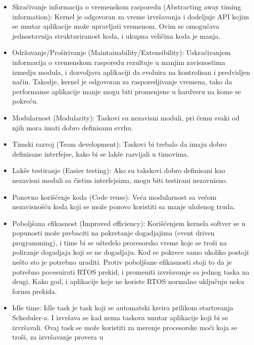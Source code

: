 \documentclass[a4paper,12pt, master]{etf}
\begin{document}
	\begin{itemize}
		\item Skra\'{c}ivanje informacija o vremenskom rasporedu (Abstracting
		away timing information):
		Kernel je odgovoran za vreme izvr\v{s}avanja i dodeljuje API kojim se
		unutar aplikacije mo\v{z}e upravljati vremenom. Ovim se omogu\'{c}ava
		jednostavnija strukturiranost koda, i ukupna veli\v{c}ina koda je manja.
		\item Odr\v{z}avanje/Pro\v{s}irivanje (Maintainability/Extensibility):
		Uskra\'{c}ivanjem informacija o vremenskom rasporedu rezultuje u manjim
		zavisnostima izmedju modula, i dozvoljava aplikaciji da evoluira na
		kontrolisan i predvidjen na\v{c}in. Takodje, kernel je odgovoran za
		rasporedjivanje vremena, tako da performanse aplikacije manje mogu biti
		promenjene u hardveru na kome se pokre\'{c}u.
		\item Modularnost (Modularity):
		Taskovi su nezavisni moduli, pri \v{c}emu svaki od njih mora imati
		dobro definisanu svrhu.
		\item Timski razvoj (Team development):
		Taskovi bi trebalo da imaju dobro definisane interfejse, kako bi se
		lak\v{s}e razvijali u timovima.
		\item Lak\v{s}e testiranje (Easier testing):
		Ako su takskovi dobro definisani kao nezavisni moduli sa \v{c}istim
		interfejsima, mogu biti	testirani nezavnisno.
		\item Ponovno kori\v{s}\'{c}enje koda (Code reuse):
		Ve\'{c}a modularnost sa ve\'{c}om nezavisno\v{s}\'{c}u koda koji se
		mo\v{z}e ponovo koristiti sa manje ulo\v{z}enog truda.
		\item Pobolj\v{s}ana efikasnost (Improved efficiency):
		Kori\v{s}\'{c}enjem kernela softver se u popunosti mo\v{z}e prebaciti
		na pokretanje dogadjajima (event driven programming), i time bi se
		u\v{s}tedelo procesorsko vreme koje se tro\v{s}i na	poliranje dogadjaja
		koji se ne dogadjaju. Kod se pokrece samo ukoliko postoji ne\v{s}to
		sto je potrebno	uraditi. Protiv pobolj\v{s}ane efikasnosti stoji to da
		je potrebno pocesuirati	RTOS prekid, i promeniti izvr\v{s}avanje sa
		jednog taska na drugi. Kako god, i aplikacije koje ne koriste RTOS
		normalno uklju\v{c}uju neku formu prekida.
		\item Idle time:
		Idle task je task koji se automatski kreira prilikom startovanja
		Scheduler-a. I izvr\v{s}ava se kad nema taskova unutar aplikacije koji
		bi se izvr\v{s}avali. Ovaj task se mo\v{z}e koristiti za merenje
		procesorske mo\'{c}i koja se tro\v{s}i, za izvr\v{s}avanje provera u

\end{itemize}
\end{document}
